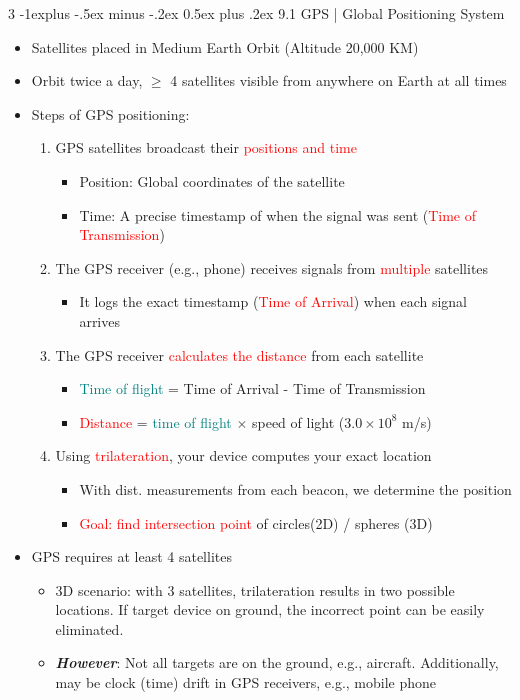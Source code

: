 \documentclass[a4paper, 9pt, landscape]{extarticle}
\makeatletter
\renewcommand{\subsection}{\@startsection{subsection}{2}{0mm}%
                                {-1explus -.5ex minus -.2ex}%
                                {0.5ex plus .2ex}%
                                {\normalfont\normalsize\bfseries}}
\makeatother
\begin{document}
\begin{multicols*}{3}
\subsection{9.1 GPS | Global Positioning System}
\begin{itemize}
  \item Satellites placed in Medium Earth Orbit (Altitude 20,000 KM)
  \item Orbit twice a day, $\geq$ 4 satellites visible from anywhere on Earth at all times
  \item Steps of GPS positioning:
  \begin{enumerate}
    \item GPS satellites broadcast their \textcolor{red}{positions and time}
    \begin{itemize}
      \item Position: Global coordinates of the satellite
      \item Time: A precise timestamp of when the signal was sent (\textcolor{red}{Time of Transmission})
    \end{itemize}
    \item The GPS receiver (e.g., phone) receives signals from \textcolor{red}{multiple} satellites
    \begin{itemize}
      \item It logs the exact timestamp (\textcolor{red}{Time of Arrival}) when each signal arrives
    \end{itemize}
    \item The GPS receiver \textcolor{red}{calculates the distance} from each satellite
    \begin{itemize}
      \item \textcolor{teal}{Time of flight} = Time of Arrival - Time of Transmission
      \item \textcolor{red}{Distance} = \textcolor{teal}{time of flight} $\times$ speed of light ($3.0 \times 10^8$ m/s)
    \end{itemize}
    \item Using \textcolor{red}{trilateration}, your device computes your exact location
    \begin{itemize}
      \item With dist. measurements from each beacon, we determine the position
      \item \textcolor{red}{Goal: find intersection point} of circles(2D) / spheres (3D)
    \end{itemize}
  \end{enumerate}
  \item GPS requires at least 4 satellites
  \begin{itemize}
    \item 3D scenario: with 3 satellites, trilateration results in two possible locations. If target device on ground, the incorrect point can be easily eliminated.
    \item \textbf{\textit{However}}: Not all targets are on the ground, e.g., aircraft. Additionally, may be clock (time) drift in GPS receivers, e.g., mobile phone
  \end{itemize}
\end{itemize}


\end{multicols*}
\end{document}
